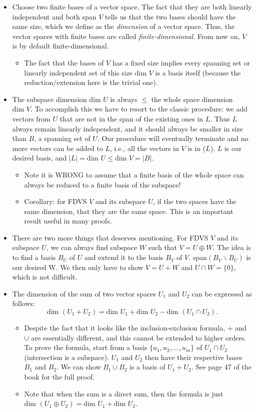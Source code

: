 \documentclass{article}
\newcommand{\s}{\text{span}}
\renewcommand{\d}{\text{dim }}
\begin{document}
\begin{itemize}
    \item Choose two finite bases of a vector space. The fact that they are both linearly independent and both span $V$ tells us that the two bases should have the same size, which we define as the \textit{dimension} of a vector space. Thus, the vector spaces with finite bases are called \textit{finite-dimensional}. From now on, $V$ is by default finite-dimensional.
    \begin{itemize}
        \item The fact that the bases of $V$ has a fixed size implies every spanning set or linearly independent set of this size $\d V$ is a basis itself (because the reduction/extension here is the trivial one).
    \end{itemize}
    \item The subspace dimension $\d U$ is always $\leq$ the whole space dimension $\d V$. To accomplish this we have to resort to the classic procedure: we add vectors from $U$ that are not in the span of the existing ones in $L$. Thus $L$ always remain linearly independent, and it should always be smaller in size than $B$, a spanning set of $U$. Our procedure will eventually terminate and no more vectors can be added to $L$, i.e., all the vectors in $V$ is in \s($L$). $L$ is our desired basis, and $|L| = \d U \leq \d V = |B|$.
    \begin{itemize}
        \item Note it is WRONG to assume that a finite basis of the whole space can always be reduced to a finite basis of the subspace!
        \item Corollary: for FDVS $V$ and its subspace $U$, if the two spaces have the same dimension, that they are the same space. This is an important result useful in many proofs.
    \end{itemize}
    \item There are two more things that deserves mentioning. For FDVS $V$ and its subspace $U$, we can always find subspace $W$ such that $V = U \oplus W$. The idea is to find a basis $B_U$ of $U$ and extend it to the basis $B_V$ of $V$. $\s (B_V \backslash B_U)$ is our desired W. We then only have to show $V = U+W$ and $U \cap W = \{0\}$, which is not difficult.
    \item The dimension of the sum of two vector spaces $U_1$ and $U_2$ can be expressed as follows: $$\d (U_1 + U_2) = \d U_1 + \d U_2 - \d (U_1 \cap U_2).$$
    \begin{itemize}
        \item Despite the fact that it looks like the inclusion-exclusion formula, $+$ and $\cup$ are essentially different, and this cannot be extended to higher orders. To prove the formula, start from a basis $\{u_1,u_2,...,u_m\}$ of $U_1 \cap U_2$ (intersection is a subspace). $U_1$ and $U_2$ then have their respective bases $B_1$ and $B_2$. We can show $B_1 \cup B_2$ is a basis of $U_1 + U_2$. See page 47 of the book for the full proof.
        \item Note that when the sum is a direct sum, then the formula is just $\d(U_1 \oplus U_2) = \d U_1 + \d U_2$.
    \end{itemize}
    
\end{itemize}
\end{document}
